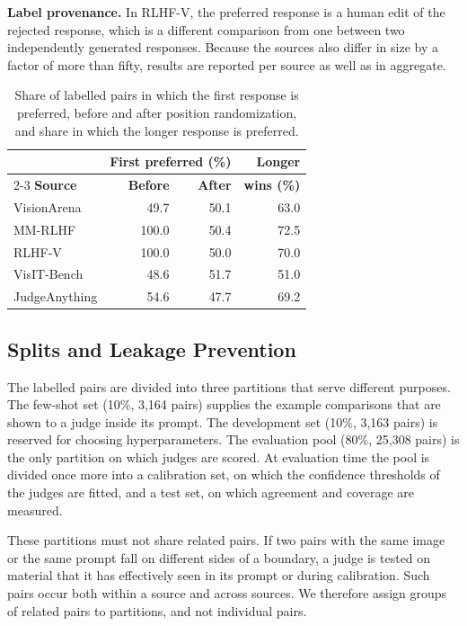 \documentclass[11pt]{article}
\begin{document}
\textbf{Label provenance.} In RLHF-V, the preferred response is a human edit of the rejected response, which is a different comparison from one between two independently generated responses. Because the sources also differ in size by a factor of more than fifty, results are reported per source as well as in aggregate.

\begin{table}[t]
\centering
\small
\setlength{\tabcolsep}{4pt}
\begin{tabular}{lrrr}
\toprule
 & \multicolumn{2}{c}{\textbf{First preferred (\%)}} & \textbf{Longer} \\
\cmidrule(lr){2-3}
\textbf{Source} & \textbf{Before} & \textbf{After} & \textbf{wins (\%)} \\
\midrule
VisionArena & 49.7 & 50.1 & 63.0 \\
MM-RLHF & 100.0 & 50.4 & 72.5 \\
RLHF-V & 100.0 & 50.0 & 70.0 \\
VisIT-Bench & 48.6 & 51.7 & 51.0 \\
JudgeAnything & 54.6 & 47.7 & 69.2 \\
\bottomrule
\end{tabular}
\caption{Share of labelled pairs in which the first response is preferred, before and after position randomization, and share in which the longer response is preferred.}
\label{tab:bias-checks}
\end{table}

\subsection{Splits and Leakage Prevention}
The labelled pairs are divided into three partitions that serve different purposes. The few-shot set (10\%, 3,164 pairs) supplies the example comparisons that are shown to a judge inside its prompt. The development set (10\%, 3,163 pairs) is reserved for choosing hyperparameters. The evaluation pool (80\%, 25,308 pairs) is the only partition on which judges are scored. At evaluation time the pool is divided once more into a calibration set, on which the confidence thresholds of the judges are fitted, and a test set, on which agreement and coverage are measured.

These partitions must not share related pairs. If two pairs with the same image or the same prompt fall on different sides of a boundary, a judge is tested on material that it has effectively seen in its prompt or during calibration. Such pairs occur both within a source and across sources. We therefore assign groups of related pairs to partitions, and not individual pairs.
\end{document}
